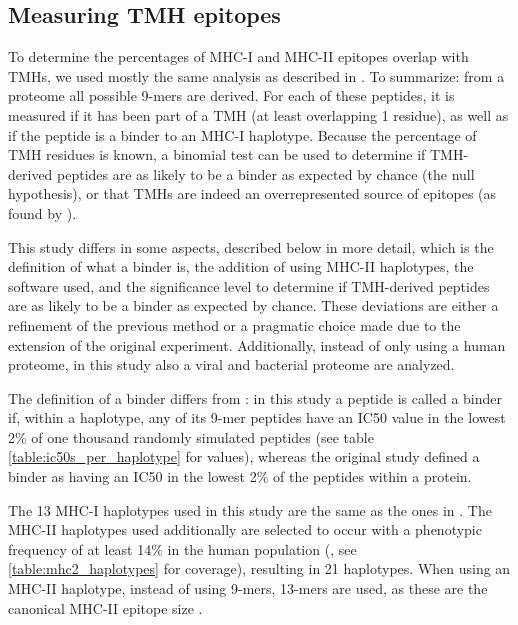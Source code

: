 \subsection{Measuring TMH epitopes}

To determine the percentages of MHC-I and MHC-II epitopes overlap
with TMHs, we used mostly the same analysis as described in \cite{bianchi2017}.
To summarize: from a proteome all possible 9-mers are derived. For each
of these peptides, it is measured if it has been part of a 
TMH (at least overlapping 1 residue), 
as well as if the peptide is a binder to an MHC-I haplotype.
Because the percentage of TMH residues is known, a binomial test can be
used to determine if TMH-derived peptides are as likely to be a binder
as expected by chance (the null hypothesis), or that TMHs are indeed an
overrepresented source of epitopes (as found by \cite{bianchi2017}).

This study differs in some aspects, described below in more detail,
which is the definition of what a binder is,
the addition of using MHC-II haplotypes, the software used,
and the significance level to determine if TMH-derived peptides are as 
likely to be a binder as expected by chance.
These deviations are either a refinement of the previous method or
a pragmatic choice made due to the extension of the original experiment.
Additionally, instead of only using a human proteome, in this study
also a viral and bacterial proteome are analyzed.

The definition of a binder differs from \cite{bianchi2017}:
in this study a peptide is called a binder if, within a haplotype, 
any of its 9-mer peptides have an IC50 value in the lowest 2\% of 
one thousand randomly simulated 
peptides (see table \ref{table:ic50s_per_haplotype} for values), 
whereas the original study defined
a binder as having an IC50 in the lowest 2\% of the peptides within a protein.

The 13 MHC-I haplotypes used in this study are the same as 
the ones in \cite{bianchi2017}.
The MHC-II haplotypes used additionally are selected 
to occur with a phenotypic frequency of at least 
14\% in
the human population (\cite{greenbaum2011functional},
see \ref{table:mhc2_haplotypes} for coverage),
resulting in 21 haplotypes.
When using an MHC-II haplotype, instead of using 9-mers, 13-mers are
used, as these are the canonical MHC-II epitope size .


